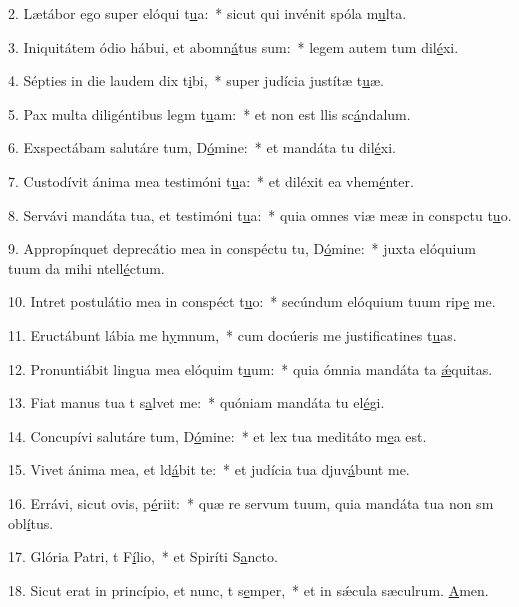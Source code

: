 2. Lætábor ego super elóqui t\uline{u}a:~* sicut qui invénit spóla m\uline{u}lta.\par 
3. Iniquitátem ódio hábui, et abomn\uline{á}tus sum:~* legem autem tum dil\uline{é}xi.\par 
4. Sépties in die laudem dix t\uline{i}bi,~* super judícia justítæ t\uline{u}æ.\par 
5. Pax multa diligéntibus legm t\uline{u}am:~* et non est llis sc\uline{á}ndalum.\par 
6. Exspectábam salutáre tum, D\uline{ó}mine:~* et mandáta tu dil\uline{é}xi.\par 
7. Custodívit ánima mea testimóni t\uline{u}a:~* et diléxit ea vhem\uline{é}nter.\par 
8. Servávi mandáta tua, et testimóni t\uline{u}a:~* quia omnes viæ meæ in conspctu t\uline{u}o.\par 
9. Appropínquet deprecátio mea in conspéctu tu, D\uline{ó}mine:~* juxta elóquium tuum da mihi ntell\uline{é}ctum.\par 
10. Intret postulátio mea in conspéct t\uline{u}o:~* secúndum elóquium tuum rip\uline{e} me.\par 
11. Eructábunt lábia me h\uline{y}mnum,~* cum docúeris me justificatines t\uline{u}as.\par 
12. Pronuntiábit lingua mea elóquim t\uline{u}um:~* quia ómnia mandáta ta \uline{ǽ}quitas.\par 
13. Fiat manus tua t s\uline{a}lvet me:~* quóniam mandáta tu el\uline{é}gi.\par 
14. Concupívi salutáre tum, D\uline{ó}mine:~* et lex tua meditáto m\uline{e}a est.\par 
15. Vivet ánima mea, et ld\uline{á}bit te:~* et judícia tua djuv\uline{á}bunt me.\par 
16. Errávi, sicut ovis,  p\uline{é}riit:~* quæ re servum tuum, quia mandáta tua non sm obl\uline{í}tus.\par 
17. Glória Patri, t F\uline{í}lio,~* et Spiríti S\uline{a}ncto.\par 
18. Sicut erat in princípio, et nunc, t s\uline{e}mper,~* et in sǽcula sæculrum. \uline{A}men.\par 
